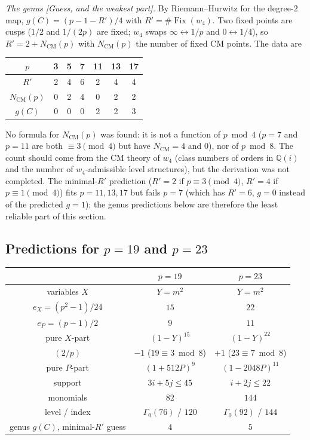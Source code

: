 \documentclass[11pt]{amsart}
\theoremstyle{plain}
\theoremstyle{definition}
\theoremstyle{remark}
\newcommand{\Q}{\mathbb{Q}}
\begin{document}
\emph{The genus [Guess, and the weakest part].} By Riemann--Hurwitz for the
degree-$2$ map, $g(C) = (p-1-R')/4$ with $R' = \#\operatorname{Fix}(w_4)$.
Two fixed points are cusps ($1/2$ and $1/(2p)$ are fixed; $w_4$ swaps
$\infty \leftrightarrow 1/p$ and $0 \leftrightarrow 1/4$), so
$R' = 2 + N_{\mathrm{CM}}(p)$ with $N_{\mathrm{CM}}(p)$ the number of fixed CM
points. The data are
\begin{center}
\begin{tabular}{c|c|c|c|c|c|c}
$p$ & 3 & 5 & 7 & 11 & 13 & 17 \\ \hline
$R'$ & 2 & 4 & 6 & 2 & 4 & 4 \\
$N_{\mathrm{CM}}(p)$ & 0 & 2 & 4 & 0 & 2 & 2 \\
$g(C)$ & 0 & 0 & 0 & 2 & 2 & 3
\end{tabular}
\end{center}
No formula for $N_{\mathrm{CM}}(p)$ was found: it is not a function of $p \bmod 4$
($p = 7$ and $p = 11$ are both $\equiv 3 \pmod 4$ but have $N_{\mathrm{CM}} = 4$
and $0$), nor of $p \bmod 8$. The count should come from the CM theory of $w_4$
(class numbers of orders in $\Q(i)$ and the number of $w_4$-admissible level
structures), but the derivation was not completed. The minimal-$R'$ prediction
($R' = 2$ if $p \equiv 3 \pmod 4$, $R' = 4$ if $p \equiv 1 \pmod 4$) fits
$p = 11, 13, 17$ but fails $p = 7$ (which has $R' = 6$, $g = 0$ instead of the
predicted $g = 1$); the genus predictions below are therefore the least
reliable part of this section.

\subsection{Predictions for $p = 19$ and $p = 23$}

\begin{center}
\begin{tabular}{c|c|c}
& $p = 19$ & $p = 23$ \\ \hline
variables $X$ & $Y = m^2$ & $Y = m^2$ \\
$e_X = (p^2-1)/24$ & $15$ & $22$ \\
$e_P = (p-1)/2$ & $9$ & $11$ \\
pure $X$-part & $(1-Y)^{15}$ & $(1-Y)^{22}$ \\
$(2/p)$ & $-1$ ($19 \equiv 3 \bmod 8$) & $+1$ ($23 \equiv 7 \bmod 8$) \\
pure $P$-part & $(1+512P)^9$ & $(1-2048P)^{11}$ \\
support & $3i+5j \leq 45$ & $i+2j \leq 22$ \\
monomials & $82$ & $144$ \\
level / index & $\Gamma_0(76)$ / $120$ & $\Gamma_0(92)$ / $144$ \\
genus $g(C)$, minimal-$R'$ guess & $4$ & $5$
\end{tabular}
\end{center}
\end{document}
